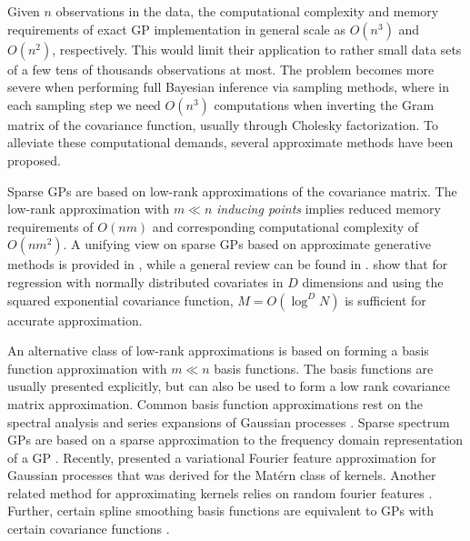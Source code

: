\documentclass[]{interact}
\theoremstyle{plain}%
\theoremstyle{definition}
\theoremstyle{remark}
\begin{document}
Given $n$ observations in the data, the computational complexity and memory requirements of exact GP implementation in general scale as $O(n^3)$ and $O(n^2)$, respectively. This would limit their application to rather small data sets of a few tens of thousands observations at most. The problem becomes more severe when performing full Bayesian inference via sampling methods, where in each sampling step we need $O(n^3)$ computations when inverting the Gram matrix of the covariance function, usually through Cholesky factorization. To alleviate these computational demands, several approximate methods have been proposed. 

Sparse GPs are based on low-rank approximations of the covariance matrix. The low-rank approximation with $m \ll n$ {\it inducing points} implies reduced memory requirements of $O(nm)$ and corresponding computational complexity of $O(nm^2)$.
A unifying view on sparse GPs based on approximate generative methods
is provided in \cite{quinonero2005unifying}, while a general review
can be found in \cite{rasmussen2006gaussian}. \citet{Burt+Rasmussen+vanderWilk:2019} show that for regression with normally distributed covariates in $D$ dimensions and using the squared exponential covariance function, $M=O(\log^DN)$ is sufficient for accurate approximation.

An alternative class of low-rank approximations is based on forming a basis function approximation with $m \ll n$ basis functions. The basis functions are usually presented explicitly, but can also be used to form a low rank covariance matrix approximation. Common basis function approximations rest on the spectral analysis and series expansions of Gaussian processes \citep{loeve1977probability,trees1968detection,adler1981geometry,cramer2013stationary}.
Sparse spectrum GPs are based on a sparse approximation to the frequency domain representation of a GP \citep{lazaro2010sparse,quia2010sparse,gal2015improving}. Recently, \cite{hensman2017variational} presented a variational Fourier feature approximation for Gaussian processes that was derived for the Mat{\'e}rn class of kernels. Another related method for approximating kernels relies on random fourier features \citep{rahimi2008random,rahimi2009weighted}.
Further, certain spline smoothing basis functions are equivalent to GPs with certain covariance functions \citep{wahba1990spline,Furrer+Nychka:2007}.
\end{document}
